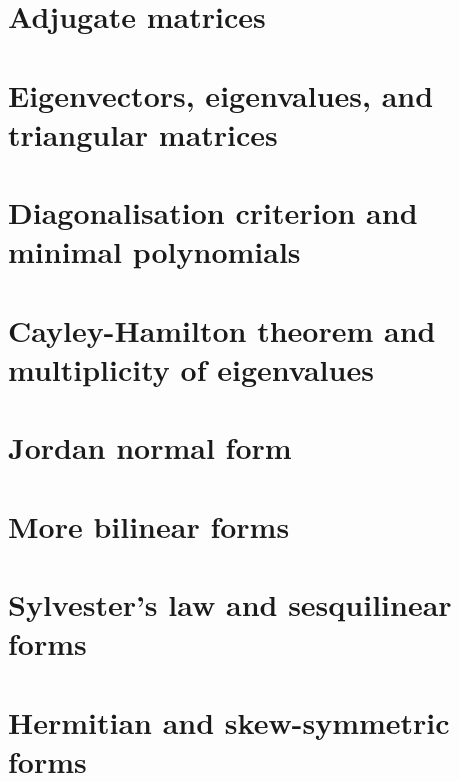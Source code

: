 \documentclass{article}
\begin{document}
\section{Adjugate matrices}

\section{Eigenvectors, eigenvalues, and triangular matrices}

\section{Diagonalisation criterion and minimal polynomials}

\section{Cayley-Hamilton theorem and multiplicity of eigenvalues}

\section{Jordan normal form}

\section{More bilinear forms}

\section{Sylvester's law and sesquilinear forms}

\section{Hermitian and skew-symmetric forms}

\end{document}
